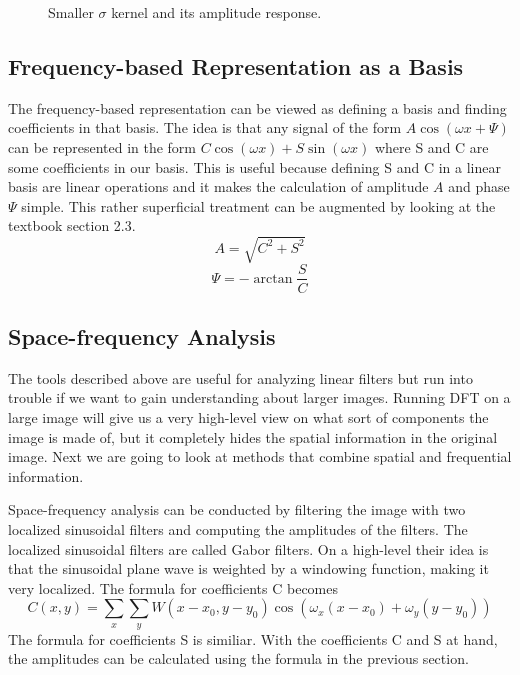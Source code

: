 \documentclass[]{article}
\begin{document}
\begin{figure}
\begin{subfigure}[t]{0.49\textwidth}
    \end{subfigure}
    \caption{Smaller $\sigma$ kernel and its amplitude response.}
\end{figure}

\subsection{Frequency-based Representation as a Basis}
\label{frequency-based-representation-as-a-basis}
The frequency-based representation can be viewed as defining a basis and
finding coefficients in that basis. The idea is that any signal of the form $A
\cos(\omega x + \Psi)$ can be represented in the form $C\cos(\omega x) +
S\sin(\omega x)$ where S and C are some coefficients in our basis. This is
useful because defining S and C in a linear basis are linear operations and it
makes the calculation of amplitude $A$ and phase $\Psi$ simple. This rather
superficial treatment can be augmented by looking at the textbook section 2.3.
\begin{equation}
  A = \sqrt{C^{2}+S^{2}}
\end{equation}
\begin{equation}
  \Psi = -\arctan{\frac{S}{C}}
\end{equation}

\subsection{Space-frequency Analysis}
\label{space-frequency-analysis}
The tools described above are useful for analyzing linear filters but run into
trouble if we want to gain understanding about larger images. Running DFT on a
large image will give us a very high-level view on what sort of components the
image is made of, but it completely hides the spatial information in the
original image. Next we are going to look at methods that combine spatial and
frequential information.

Space-frequency analysis can be conducted by filtering the image with two
localized sinusoidal filters and computing the amplitudes of the filters. The
localized sinusoidal filters are called Gabor filters. On a high-level their
idea is that the sinusoidal plane wave is weighted by a windowing function,
making it very localized. The formula for coefficients C becomes
\begin{equation}
  C(x,y) = \sum_{x}{\sum_{y}{W(x-x_{0}, y-y_{0}) \cos(\omega_{x} (x - x_{0}) + \omega_{y} (y - y_{0})) }}
\end{equation}
The formula for coefficients S is similiar. With the coefficients C and S at
hand, the amplitudes can be calculated using the formula in the previous
section.
\end{document}
